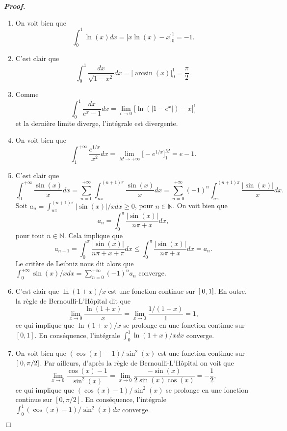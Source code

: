 \documentclass[11pt,a4paper]{article}
\newcommand{\NN}{\mathbb{N}}
\newenvironment{preuve}[1][]
{\vskip 2mm  \noindent\emph{\bf Proof#1. }}{$\Box$ \vskip 2mm}
\let\geq\geqslant
\let\leq\leqslant
\begin{document}
	\begin{preuve}
		\begin{enumerate}
			\item On voit bien que
			\[     \int_0^1 \ln (x) dx = \bigg[ x \ln(x) - x \bigg]_{0}^{1} = -1.     \]
			
			\item C'est clair que
			\[     \int_0^1 \frac{dx}{\sqrt{1-x^2}} dx = \bigg[ \arcsin(x) \bigg]_{0}^{1} = \frac{\pi}{2}.     \]
			
			\item Comme 
			\[     \int_0^1 \frac{dx}{e^x-1} dx = \underset{\epsilon \rightarrow 0}{\lim} \bigg[ \ln(|1 - e^{x}|) - x \bigg]_{\epsilon}^{1}     \]
			et la dernière limite diverge, l'intégrale est divergente. 
			
			\item On voit bien que
			\[     \int_1^{+\infty} \frac{e^{1/x}}{x^2} dx = \underset{M \rightarrow + \infty}{\lim} \bigg[ - e^{1/x} \bigg]_{1}^{M} = e -1.     \]
			
			\item C'est clair que
			\[     \int_{0}^{+\infty} \frac{\sin(x)}{x} dx = \sum_{n=0}^{+\infty} \int_{n \pi}^{(n+1)\pi} \frac{\sin(x)}{x} dx = \sum_{n=0}^{+\infty} (-1)^{n} \int_{n \pi}^{(n+1)\pi} \frac{|\sin(x)|}{x} dx.     \]
			Soit $a_{n} = \int_{n \pi}^{(n+1)\pi} |\sin(x)|/x dx \geq 0$, pour $n \in \NN$. 
			On voit bien que 
			\[     a_{n} = \int_{0}^{\pi} \frac{|\sin(x)|}{n\pi + x} dx,     \]
			pour tout $n \in \NN$.
			Cela implique que 
			\[     a_{n+1} = \int_{0}^{\pi} \frac{|\sin(x)|}{n\pi + x + \pi} dx \leq \int_{0}^{\pi} \frac{|\sin(x)|}{n\pi + x} dx = a_{n}.     \]
			Le critère de Leibniz nous dit alors que $\int_0^{+\infty} \sin(x)/x dx = \sum_{n=0}^{+\infty} (-1)^{n} a_{n}$ converge. 
			
			\item C'est clair que $\ln(1+x)/x$ est une fonction continue sur $\hskip 0.6mm ] \hskip 0.6mm 0,1]$. 
			En outre, la règle de Bernoulli-L'H\^opital dit que 
			\[     \underset{x \rightarrow 0}{\lim} \frac{\ln(1+x)}{x} = \underset{x \rightarrow 0}{\lim} \frac{1/(1+x)}{1} = 1,     \]
			ce qui implique que $\ln(1+x)/x$ se prolonge en une fonction continue sur $[ 0,1]$. 
			En conséquence, l'intégrale $\int_0^1 \ln(1+x)/x dx$ converge. 
			
			\item On voit bien que $(\cos (x)-1)/\sin^2 (x)$ est une fonction continue sur $\hskip 0.6mm ] \hskip 0.6mm 0,\pi/2]$. 
			Par ailleurs, d'après la règle de Bernoulli-L'H\^opital on voit que 
			\[     \underset{x \rightarrow 0}{\lim} \frac{\cos (x)-1}{\sin^2 (x)} = \underset{x \rightarrow 0}{\lim} \frac{-\sin(x)}{2 \sin(x) \cos(x)} = - \frac{1}{2},     \]
			ce qui implique que $(\cos (x)-1)/\sin^2 (x)$ se prolonge en une fonction continue sur $[ 0,\pi/2]$. 
			En conséquence, l'intégrale $\int_0^1 (\cos (x)-1)/\sin^2 (x) dx$ converge. 
			

\end{enumerate}
\end{preuve}
\end{document}
